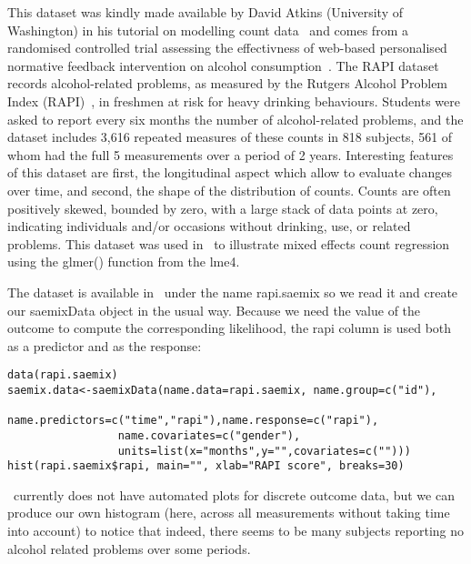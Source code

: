 This dataset was kindly made available by David Atkins (University of Washington) in his tutorial on modelling count data~\cite{Atkins13} and comes from a randomised controlled trial assessing the effectivness of web-based personalised normative feedback intervention on alcohol consumption~\cite{Neighbors10a, Neighbors10b}. The {\sf RAPI dataset} records alcohol-related problems, as measured by the Rutgers Alcohol Problem Index (RAPI)~\cite{White89}, in freshmen at risk for heavy drinking behaviours. Students were asked to report every six months the number of alcohol-related problems, and the dataset includes 3,616 repeated measures of these counts in 818 subjects, 561 of whom had the full 5 measurements over a period of 2 years. Interesting features of this dataset are first, the longitudinal aspect which allow to evaluate changes over time, and second, the shape of the distribution of counts. Counts are often positively skewed, bounded by zero, with a large stack of data points at zero, indicating individuals and/or occasions without drinking, use, or related problems. This dataset was used in~\cite{Atkins13} to illustrate mixed effects count regression using the {\sf glmer()} function from the {\sf lme4}.

The dataset is available in \monolix~under the name {\sf rapi.saemix} so we read it and create our saemixData object in the usual way. Because we need the value of the outcome to compute the corresponding likelihood, the {\sf rapi} column is used both as a predictor and as the response:
\begin{verbatim}
data(rapi.saemix)
saemix.data<-saemixData(name.data=rapi.saemix, name.group=c("id"),
                 name.predictors=c("time","rapi"),name.response=c("rapi"),
                 name.covariates=c("gender"),
                 units=list(x="months",y="",covariates=c("")))
hist(rapi.saemix$rapi, main="", xlab="RAPI score", breaks=30)
\end{verbatim}
\monolix~currently does not have automated plots for discrete outcome data, but we can produce our own histogram (here, across all measurements without taking time into account) to notice that indeed, there seems to be many subjects reporting no alcohol related problems over some periods.

